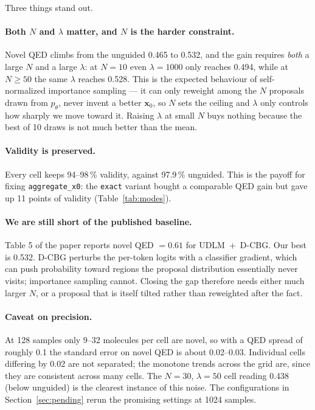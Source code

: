 \documentclass[11pt]{article}
\begin{document}
Three things stand out.

\paragraph{Both $N$ and $\lambda$ matter, and $N$ is the harder constraint.}
Novel QED climbs from the unguided 0.465 to 0.532, and the gain requires
\emph{both} a large $N$ and a large $\lambda$: at $N = 10$ even
$\lambda = 1000$ only reaches 0.494, while at $N \ge 50$ the same $\lambda$
reaches 0.528. This is the expected behaviour of self-normalized importance
sampling --- it can only reweight among the $N$ proposals drawn from
$p_\theta$, never invent a better $\mathbf{x}_0$, so $N$ sets the ceiling and
$\lambda$ only controls how sharply we move toward it. Raising $\lambda$ at
small $N$ buys nothing because the best of 10 draws is not much better than the
mean.

\paragraph{Validity is preserved.}
Every cell keeps 94--98\,\% validity, against 97.9\,\% unguided. This is the
payoff for fixing \texttt{aggregate\_x0}: the \texttt{exact} variant bought a
comparable QED gain but gave up 11 points of validity
(Table~\ref{tab:modes}).

\paragraph{We are still short of the published baseline.}
Table 5 of the paper reports novel QED $= 0.61$ for UDLM~+~D-CBG. Our best is
0.532. D-CBG perturbs the per-token logits with a classifier gradient, which
can push probability toward regions the proposal distribution essentially never
visits; importance sampling cannot. Closing the gap therefore needs either much
larger $N$, or a proposal that is itself tilted rather than reweighted after
the fact.

\paragraph{Caveat on precision.}
At 128 samples only 9--32 molecules per cell are novel, so with a QED spread of
roughly 0.1 the standard error on novel QED is about 0.02--0.03. Individual
cells differing by 0.02 are not separated; the monotone trends across the grid
are, since they are consistent across many cells. The $N = 30$,
$\lambda = 50$ cell reading 0.438 (below unguided) is the clearest instance of
this noise. The configurations in Section~\ref{sec:pending} rerun the promising
settings at 1024 samples.
\end{document}
